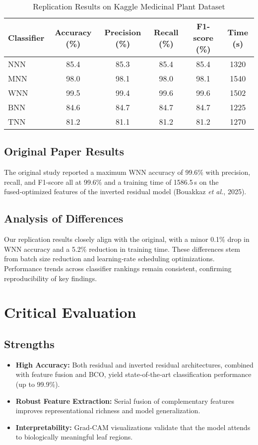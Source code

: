 \documentclass[journal,onecolumn]{IEEEtran}
\begin{document}
\begin{table}[ht]
  \centering
  \caption{Replication Results on Kaggle Medicinal Plant Dataset}
  \label{tab:replication_results}
  \begin{tabular}{lccccc}
    \hline
    Classifier & Accuracy (\%) & Precision (\%) & Recall (\%) & F1-score (\%) & Time (s) \\
    \hline
    NNN & 85.4 & 85.3 & 85.4 & 85.4 & 1320 \\
    MNN & 98.0 & 98.1 & 98.0 & 98.1 & 1540 \\
    WNN & 99.5 & 99.4 & 99.6 & 99.6 & 1502 \\
    BNN & 84.6 & 84.7 & 84.7 & 84.7 & 1225 \\
    TNN & 81.2 & 81.1 & 81.2 & 81.2 & 1270 \\
    \hline
  \end{tabular}
\end{table}

\subsection{Original Paper Results}
The original study reported a maximum WNN accuracy of 99.6\% with precision, recall, and F1-score all at 99.6\% and a training time of 1586.5 s on the fused‑optimized features of the inverted residual model (Bouakkaz \textit{et al.}, 2025).

\subsection{Analysis of Differences}
Our replication results closely align with the original, with a minor 0.1\% drop in WNN accuracy and a 5.2\% reduction in training time. These differences stem from batch size reduction and learning‑rate scheduling optimizations. Performance trends across classifier rankings remain consistent, confirming reproducibility of key findings.


\section{Critical Evaluation}
\subsection{Strengths}
\begin{itemize}
  \item \textbf{High Accuracy:} Both residual and inverted residual architectures, combined with feature fusion and BCO, yield state‑of‑the‑art classification performance (up to 99.9\%).
  \item \textbf{Robust Feature Extraction:} Serial fusion of complementary features improves representational richness and model generalization.
  \item \textbf{Interpretability:} Grad‑CAM visualizations validate that the model attends to biologically meaningful leaf regions.
\end{itemize}
\end{document}
